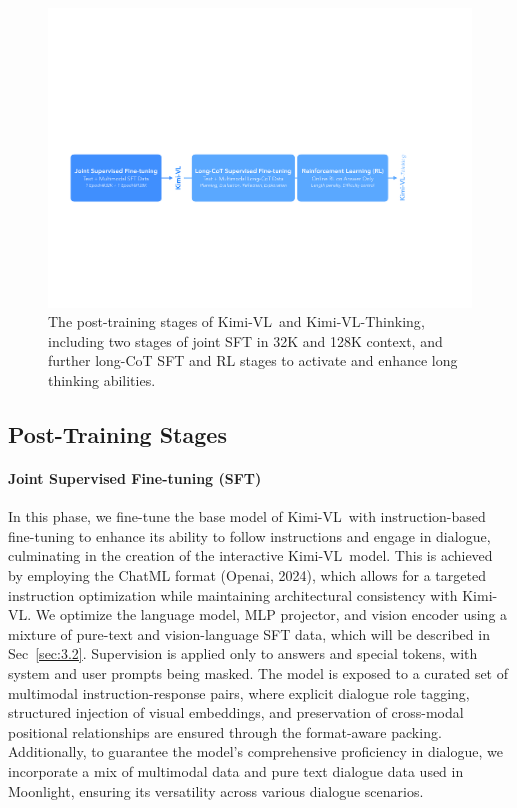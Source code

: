 \documentclass{article}
\newcommand{\ourname}{{Kimi-VL}}
\newcommand{\ourreasoningname}{{\ourname-Thinking}}
\begin{document}
\begin{figure}[t]
\centering
\includegraphics[width=\textwidth]{figures/post-training-stages.pdf}
\caption{The post-training stages of \ourname~and \ourreasoningname, including two stages of joint SFT in 32K and 128K context, and further long-CoT SFT and RL stages to activate and enhance long thinking abilities.}
\label{fig:posttrainingstages}
\end{figure}


\subsection{Post-Training Stages}

\paragraph{Joint Supervised Fine-tuning (SFT)}

In this phase, we fine-tune the base model of \ourname~with instruction-based fine-tuning to enhance its ability to follow instructions and engage in dialogue, culminating in the creation of the interactive \ourname~model. This is achieved by employing the ChatML format (Openai, 2024), which allows for a targeted instruction optimization while maintaining architectural consistency with \ourname. We optimize the language model, MLP projector, and vision encoder using a mixture of pure-text and vision-language SFT data, which will be described in Sec~\ref{sec:3.2}. Supervision is applied only to answers and special tokens, with system and user prompts being masked. The model is exposed to a curated set of multimodal instruction-response pairs, where explicit dialogue role tagging, structured injection of visual embeddings, and preservation of cross-modal positional relationships are ensured through the format-aware packing. Additionally, to guarantee the model's comprehensive proficiency in dialogue, we incorporate a mix of multimodal data and pure text dialogue data used in Moonlight, ensuring its versatility across various dialogue scenarios.
\end{document}

